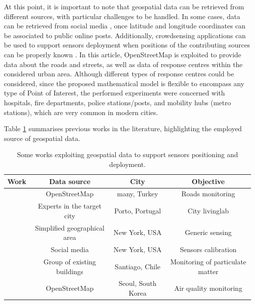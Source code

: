 \begin{refsection}
At this point, it is important to note that geospatial data can be retrieved from different sources, with particular challenges to be handled. In some cases, data can be retrieved from social media \cite{twitterGeospatialSensors}, once latitude and longitude coordinates can be associated to public online posts. Additionally, crowdsensing applications can be used to support sensors deployment when positions of the contributing sources can be properly known \cite{positioning5}. In this article, OpenStreetMap is exploited to provide data about the roads and streets, as well as data of response centres within the considered urban area. Although different types of response centres could be considered, since the proposed mathematical model is flexible to encompass any type of Point of Interest, the performed experiments were concerned with hospitals, fire departments, police stations/posts, and mobility hubs (metro stations), which are very common in modern cities. 

Table \ref{Table:related} summarises previous works in the literature, highlighting the employed source of geospatial data. 

\begin{table}
    \centering
    \caption{Some works exploiting geospatial data to support sensors positioning and deployment.}
    \label{Table:related}
    \begin{tabular}{|c|c|c|c|}
        \hline
        \textbf{Work} & \textbf{Data source} & \textbf{City} & \textbf{Objective} \\ 
        \hline
        \cite{positioning1} \cite{positioning1}  &  OpenStreetMap & many, Turkey & Roads monitoring\\ 
        \hline
        \cite{positions2} \cite{positions2}  & Experts in the target city & Porto, Portugal & City livinglab \\ 
        \hline
        \cite{positioning3} \cite{positioning3} & Simplified geographical area & New York, USA & Generic sensing \\ 
        \hline
        \cite{twitterGeospatialSensors} \cite{twitterGeospatialSensors} & Social media & New York, USA & Sensors calibration \\ 
        \hline
        \cite{positioning4} \cite{positioning4} & Group of existing buildings & Santiago, Chile & Monitoring of particulate matter \\ 
        \hline
        \cite{positioning5} \cite{positioning5} &  OpenStreetMap & Seoul, South Korea & Air quality monitoring \\ 
        \hline
    \end{tabular}
\end{table}


\end{refsection}
